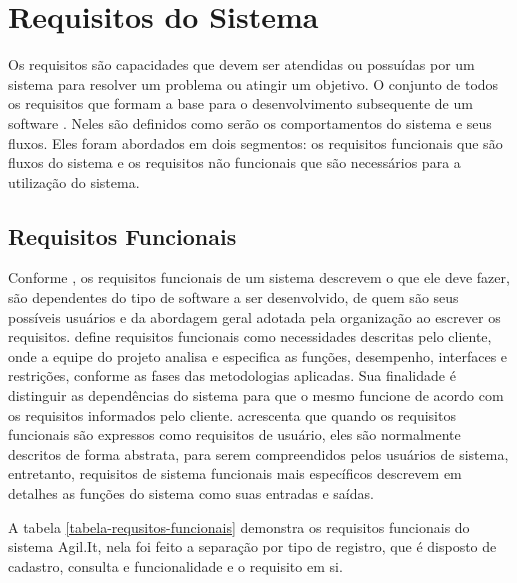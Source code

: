 \chapter{Requisitos do Sistema}

Os requisitos são capacidades que devem ser atendidas ou possuídas por um sistema para resolver um problema ou atingir um objetivo. O conjunto de todos os requisitos que formam a base para o desenvolvimento subsequente de um software \cite{vazquez2016}. Neles são definidos como serão os comportamentos do sistema e seus fluxos. Eles foram  abordados em dois segmentos: os requisitos funcionais que são fluxos do sistema e os requisitos não funcionais que são necessários para a utilização do sistema.

\section{Requisitos Funcionais}

Conforme \cite{sommerville2011software}, os requisitos funcionais de um sistema descrevem o que ele deve fazer, são dependentes do tipo de software a ser desenvolvido, de quem são seus possíveis usuários e da abordagem geral adotada pela organização ao escrever os requisitos. \cite{essi2005} define requisitos funcionais como necessidades descritas pelo cliente, onde a equipe do projeto analisa e especifica as funções, desempenho, interfaces e restrições, conforme as fases das metodologias aplicadas. Sua finalidade é distinguir as dependências do sistema para que o mesmo funcione de acordo com os requisitos informados pelo cliente.
\cite{sommerville2011software} acrescenta que quando os requisitos funcionais são expressos como requisitos de usuário, eles são normalmente descritos de forma abstrata, para serem compreendidos pelos usuários de sistema, entretanto, requisitos de sistema funcionais mais específicos descrevem em detalhes as funções do sistema como suas entradas e saídas.

A tabela \ref{tabela-requsitos-funcionais} demonstra os requisitos funcionais do sistema Agil.It, nela foi feito a separação por tipo de registro, que é disposto de cadastro, consulta e funcionalidade e o requisito em si.

